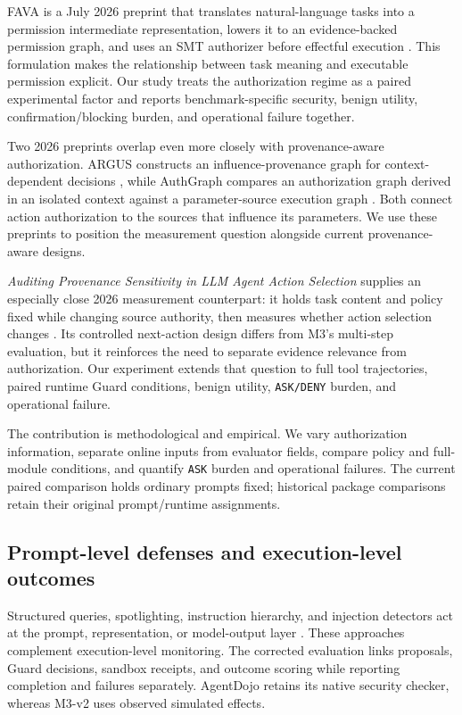 FAVA is a July 2026 preprint that translates natural-language tasks into a permission intermediate representation, lowers it to an evidence-backed permission graph, and uses an SMT authorizer before effectful execution \citep{L36}. This formulation makes the relationship between task meaning and executable permission explicit. Our study treats the authorization regime as a paired experimental factor and reports benchmark-specific security, benign utility, confirmation/blocking burden, and operational failure together.

Two 2026 preprints overlap even more closely with provenance-aware authorization. ARGUS constructs an influence-provenance graph for context-dependent decisions \citep{L21}, while AuthGraph compares an authorization graph derived in an isolated context against a parameter-source execution graph \citep{L22}. Both connect action authorization to the sources that influence its parameters. We use these preprints to position the measurement question alongside current provenance-aware designs.

\textit{Auditing Provenance Sensitivity in LLM Agent Action Selection} supplies an especially close 2026 measurement counterpart: it holds task content and policy fixed while changing source authority, then measures whether action selection changes \citep{L35}. Its controlled next-action design differs from M3's multi-step evaluation, but it reinforces the need to separate evidence relevance from authorization. Our experiment extends that question to full tool trajectories, paired runtime Guard conditions, benign utility, \nolinkurl{ASK/DENY} burden, and operational failure.

The contribution is methodological and empirical. We vary authorization information, separate online inputs from evaluator fields, compare policy and full-module conditions, and quantify \nolinkurl{ASK} burden and operational failures. The current paired comparison holds ordinary prompts fixed; historical package comparisons retain their original prompt/runtime assignments.

\subsection{Prompt-level defenses and execution-level outcomes}

\label{sec:related-work-prompt-level-defenses-and-execution-level-outcomes}

Structured queries, spotlighting, instruction hierarchy, and injection detectors act at the prompt, representation, or model-output layer \citep{L07,L30,L31,L32}. These approaches complement execution-level monitoring. The corrected evaluation links proposals, Guard decisions, sandbox receipts, and outcome scoring while reporting completion and failures separately. AgentDojo retains its native security checker, whereas M3-v2 uses observed simulated effects.

